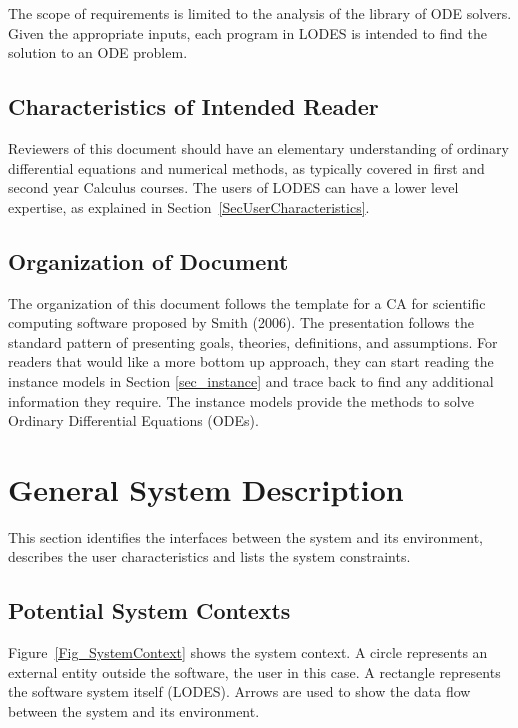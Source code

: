 \documentclass[12pt]{article}
\newcommand{\progname}{LODES} %
\begin{document}
The scope of requirements is limited to the analysis of the library of ODE solvers. Given
the appropriate inputs, each program in \progname{} is intended to find the solution to an
ODE problem.

\subsection{Characteristics of Intended Reader}

Reviewers of this document should have an elementary understanding of ordinary differential
equations and numerical methods, as typically covered in first and second year Calculus courses.
The users of \progname{} can have a lower level expertise, as explained in
Section~\ref{SecUserCharacteristics}.

\subsection{Organization of Document}

The organization of this document follows the template for a CA for scientific
computing software proposed by Smith (2006). The presentation follows the standard
pattern of presenting goals, theories, definitions, and assumptions. For readers that would
like a more bottom up approach, they can start reading the instance models in Section
\ref{sec_instance} and trace back to find any additional information they require.  The
instance models provide the methods to solve Ordinary Differential Equations (ODEs).

\section{General System Description}

This section identifies the interfaces between the system and its environment,
describes the user characteristics and lists the system constraints.

\subsection{Potential System Contexts}

Figure~\ref{Fig_SystemContext} shows the system context.  A circle represents an
external entity outside the software, the user in this case.  A rectangle
represents the software system itself (\progname{}).  Arrows are used to show the data
flow between the system and its environment.
\end{document}
